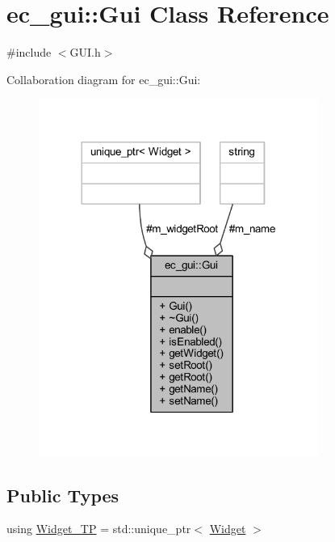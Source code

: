 \hypertarget{classec__gui_1_1_gui}{}\section{ec\+\_\+gui\+:\+:Gui Class Reference}
\label{classec__gui_1_1_gui}


{\ttfamily \#include $<$G\+U\+I.\+h$>$}



Collaboration diagram for ec\+\_\+gui\+:\+:Gui\+:\nopagebreak
\begin{figure}[H]
\begin{center}
\leavevmode
\includegraphics[width=260pt]{classec__gui_1_1_gui__coll__graph}
\end{center}
\end{figure}
\subsection*{Public Types}
\begin{DoxyCompactItemize}
\item 
using \mbox{\hyperlink{classec__gui_1_1_gui_af2df87aa1795fe5b141e1137084f7822}{Widget\+\_\+\+TP}} = std\+::unique\+\_\+ptr$<$ \mbox{\hyperlink{classec__gui_1_1_widget}{Widget}} $>$
\end{DoxyCompactItemize}
